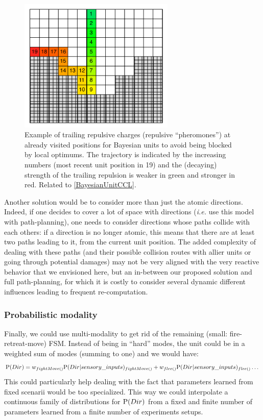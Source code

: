 \begin{figure}[h]
\begin{center}
\includegraphics[width=7.4cm]{images/trailing_pheromones.pdf}
\caption{Example of trailing repulsive charges (repulsive ``pheromones'') at already visited positions for Bayesian units to avoid being blocked by local optimums. The trajectory is indicated by the increasing numbers (most recent unit position in 19) and the (decaying) strength of the trailing repulsion is weaker in green and stronger in red. Related to \ref{BayesianUnitCCL}.}
\label{fig:BayesianTrailingPheromone}
\end{center}
\end{figure}

Another solution would be to consider more than just the atomic directions. Indeed, if one decides to cover a lot of space with directions (\textit{i.e.} use this model with path-planning), one needs to consider directions whose paths collide with each others: if a direction is no longer atomic, this means that there are at least two paths leading to it, from the current unit position. The added complexity of dealing with these paths (and their possible collision routes with allier units or going through potential damages) may not be very aligned with the very reactive behavior that we envisioned here, but an in-between our proposed solution and full path-planning, for which it is costly to consider several dynamic different influences leading to frequent re-computation.

\subsubsection{Probabilistic modality}
Finally, we could use multi-modality \citep{Colas10} to get rid of the remaining (small: fire-retreat-move) FSM. Instead of being in ``hard'' modes, the unit could be in a weighted sum of modes (summing to one) and we would have:
$$\mathrm{P}(Dir) = w_{fightMove()}\mathrm{P}(Dir|sensory\_inputs)_{fightMove()} + w_{flee()}\mathrm{P}(Dir|sensory\_inputs)_{flee()} \dots$$
This could particularly help dealing with the fact that parameters learned from fixed scenarii would be too specialized. This way we could interpolate a continuous family of distributions for $\mathrm{P}(Dir)$ from a fixed and finite number of parameters learned from a finite number of experiments setups.

